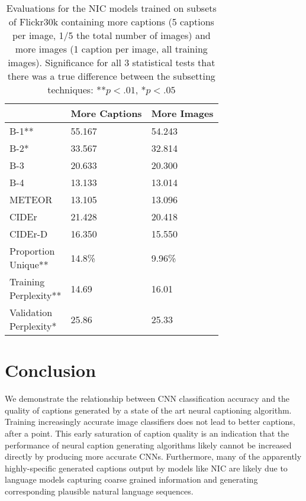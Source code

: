 \documentclass[11pt]{article}
\begin{document}
\begin{table}[t]
\centering
\begin{tabular}{|l|l|l|}
      \hline
       & More Captions & More Images\\\hline
      B-1** & 55.167 & 54.243\\\hline
      B-2* & 33.567 & 32.814\\\hline
      B-3 & 20.633 & 20.300\\\hline
      B-4 & 13.133 & 13.014\\\hline
      METEOR & 13.105 & 13.096\\\hline
      CIDEr & 21.428 & 20.418\\\hline
      CIDEr-D & 16.350 & 15.550\\\hline\hline
      \pbox{20cm}{Proportion\\Unique**} & 14.8\% & 9.96\%\\\hline
      \pbox{20cm}{Training\\Perplexity**} & 14.69 & 16.01\\\hline
      \pbox{20cm}{Validation\\Perplexity*} & 25.86 & 25.33\\\hline
\end{tabular}
    \caption{Evaluations for the NIC models trained on subsets of
      Flickr30k containing more captions (5 captions per image, 1/5
      the total number of images) and more images (1 caption per
      image, all training images). Significance for all 3 statistical
      tests that there was a true difference between the subsetting
      techniques: **$p<.01$, *$p<.05$}
    \label{tab:morecap}
\end{table}

\section{Conclusion}
We demonstrate the relationship between CNN classification accuracy
and the quality of captions generated by a state of the art neural
captioning algorithm. Training increasingly accurate image classifiers
does not lead to better captions, after a point. This early saturation
of caption quality is an indication that the performance of neural
caption generating algorithms likely cannot be increased directly by
producing more accurate CNNs. Furthermore, many of the apparently
highly-specific generated captions output by models like NIC are
likely due to language models capturing coarse grained information
and generating corresponding plausible natural language sequences.
\end{document}

